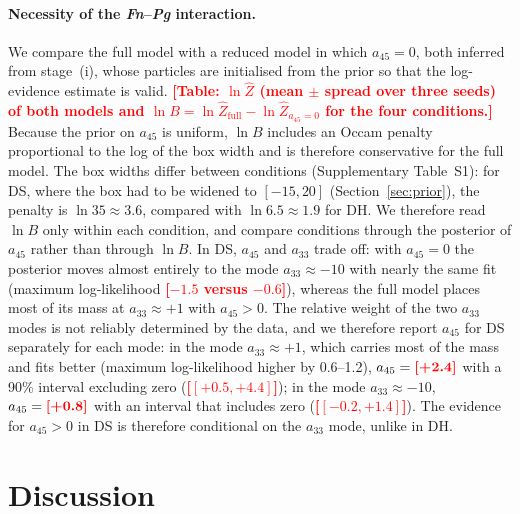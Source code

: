 \documentclass[11pt,a4paper]{article}
\newcommand{\TBD}[1]{\textcolor{red}{\textbf{[#1]}}}
\begin{document}
\paragraph{Necessity of the \textit{Fn}--\textit{Pg} interaction.}
We compare the full model with a reduced model in which $a_{45}=0$, both inferred from stage~(i), whose particles are initialised from the prior so that the log-evidence estimate is valid.
\TBD{Table: $\ln\hat Z$ (mean $\pm$ spread over three seeds) of both models and $\ln B=\ln\hat Z_{\mathrm{full}}-\ln\hat Z_{a_{45}=0}$ for the four conditions.}
Because the prior on $a_{45}$ is uniform, $\ln B$ includes an Occam penalty proportional to the log of the box width and is therefore conservative for the full model. The box widths differ between conditions (Supplementary Table~S1): for DS, where the box had to be widened to $[-15,20]$ (Section~\ref{sec:prior}), the penalty is $\ln 35\approx3.6$, compared with $\ln 6.5\approx1.9$ for DH. We therefore read $\ln B$ only within each condition, and compare conditions through the posterior of $a_{45}$ rather than through $\ln B$. In DS, $a_{45}$ and $a_{33}$ trade off: with $a_{45}=0$ the posterior moves almost entirely to the mode $a_{33}\approx-10$ with nearly the same fit (maximum log-likelihood \TBD{$-1.5$ versus $-0.6$}), whereas the full model places most of its mass at $a_{33}\approx+1$ with $a_{45}>0$. The relative weight of the two $a_{33}$ modes is not reliably determined by the data, and we therefore report $a_{45}$ for DS separately for each mode: in the mode $a_{33}\approx+1$, which carries most of the mass and fits better (maximum log-likelihood higher by 0.6--1.2), $a_{45}=\TBD{+2.4}$ with a 90\% interval excluding zero (\TBD{$[+0.5,+4.4]$}); in the mode $a_{33}\approx-10$, $a_{45}=\TBD{+0.8}$ with an interval that includes zero (\TBD{$[-0.2,+1.4]$}). The evidence for $a_{45}>0$ in DS is therefore conditional on the $a_{33}$ mode, unlike in DH.

\section{Discussion}
\label{sec:discussion}
\end{document}
